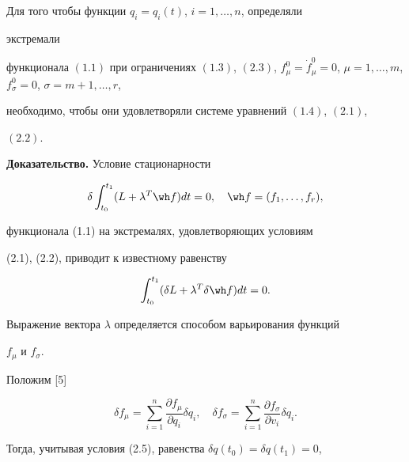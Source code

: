  


\begin{thm} 


Для того чтобы функции $q_i=q_i(t)$, $i=1,\dotsc,n$, определяли 


экстремали 


функционала $(1.1)$ при ограничениях $(1.3)$, $(2.3)$, $f^0_\mu=\Dot 


f^0_\mu=0$, $\mu=1,\dotsc,m$, $f^0_\sigma=0$, $\sigma=m+1,\dotsc,r$, 


необходимо, чтобы они удовлетворяли системе уравнений $(1.4)$, $(2.1)$, 


$(2.2)$. 


\end{thm} 


 


{\bf Доказательство.} Условие стационарности 


$$ 


\delta\int^{t_1}_{t_0}(L+\lambda^T\wh f)d t=0,\quad 


\wh f=(f_1,\dotsc,f_r), 


$$ 


функционала (1.1) на экстремалях, удовлетворяющих условиям 


(2.1), (2.2), приводит к известному равенству 


\begin{equation} 


\int^{t_1}_{t_0}(\delta L+\lambda^T\delta\wh f)d t=0. 


\end{equation} 


 


Выражение вектора $\lambda$ определяется способом варьирования функций 


$f_\mu$ и $f_\sigma$. 


Положим [5] 


\begin{equation} 


\delta f_\mu=\sum^n_{i=1}\frac{\partial f_\mu}{\partial q_i} 


\delta q_i,\quad \delta f_\sigma=\sum^n_{i=1} 


\frac{\partial f_\sigma}{\partial v_i}\delta q_i. 


\end{equation} 


Тогда, учитывая условия (2.5), равенства $\delta q(t_0)=\delta q(t_1)=0$, 


